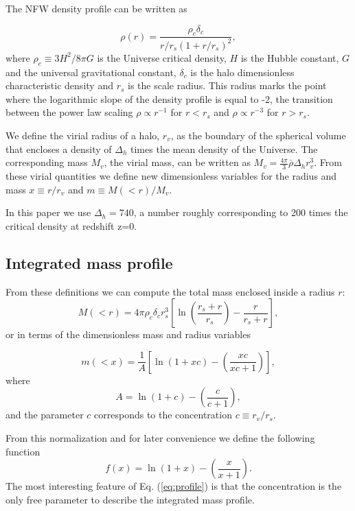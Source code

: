 \documentclass{emulateapj}
\begin{document}
The NFW density profile can be written as

\begin{equation}
\rho(r) = \frac{\rho_c\delta_c}{r/r_s(1+r/r_s)^2},
\label{eq:definition}
\end{equation}
%
where $\rho_c\equiv 3H^2/8\pi G$ is the Universe critical density, $H$
is the Hubble constant, $G$ and the universal gravitational constant,
$\delta_c$ is the halo dimensionless characteristic density and $r_s$
is the scale radius.  This radius marks the point where the
logarithmic slope of the density profile is equal to -2, the
transition between the power law scaling $\rho\propto r^{-1}$ for
$r<r_s$ and $\rho\propto r^{-3}$ for $r>r_s$.

We define the virial radius of a halo, $r_v$, as the boundary of the
spherical volume that encloses a density of $\Delta_h$ times the mean
density of the Universe.  The corresponding mass $M_{v}$, the virial
mass, can be written as $M_{v} = \frac{4\pi}{3}\bar{\rho}\Delta_h
r_v^3$.  From these virial quantities we define new dimensionless
variables for the radius and mass $x\equiv r/r_v$ and $m\equiv
M(<r)/M_v$.

In this paper we use $\Delta_h=740$, a number roughly corresponding to
200 times the critical density at redshift z=0.


\subsection{Integrated mass profile}

From these definitions we can compute the total mass enclosed inside a
radius $r$:
\begin{equation}
M(<r) = 4\pi\rho_c\delta_c  r_s^3\left[\ln \left
  (\frac{r_s+r}{r_s}\right) - \frac{r}{r_s+r}\right],
\end{equation}
%
or in terms of the dimensionless mass and radius variables

\begin{equation}
m(<x) =
\frac{1}{A}\left[\ln\left(1+xc\right)-\left(\frac{xc}{xc+1}\right)\right],
\label{eq:profile}
\end{equation}
%
where
%
\begin{equation}
A=\ln\left(1+c\right)-\left(\frac{c}{c+1}\right),
\end{equation}
%
and the parameter $c$ corresponds to the concentration $c\equiv
r_v/r_s$.

From this normalization and for later convenience we define the
following function
%
\begin{equation}
f(x) = \ln\left(1+x\right)-\left(\frac{x}{x+1}\right).
\label{eq:f_NFW}
\end{equation}
%
The most interesting feature of Eq. (\ref{eq:profile}) is that the
concentration is the only free parameter to describe the integrated
mass profile.
 
\end{document}

